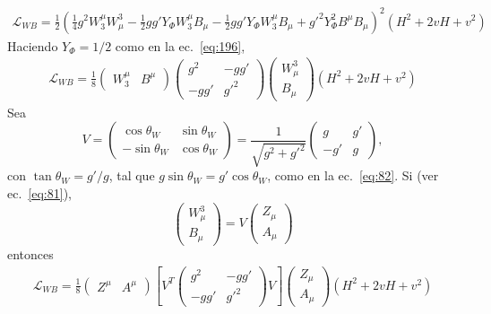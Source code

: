 \begin{align}
  \mathcal{L}_{WB}=\frac{1}{2}\left(\tfrac{1}{4}g^2W_3^\mu W^3_\mu-\tfrac{1}{2}gg'Y_\Phi W_3^\mu B_\mu-\tfrac{1}{2}gg'Y_\Phi W_3^\mu B_\mu+{g'}^2Y_\Phi ^2B^\mu B_\mu\right)^2\left(H^2+2vH+v^2\right)
\end{align}
Haciendo $Y_\Phi =1/2$ como en la ec.~\eqref{eq:196},
\begin{align}
  \mathcal{L}_{WB}=\frac{1}{8}
  \begin{pmatrix}
    W^\mu_3 & B^\mu
  \end{pmatrix}
  \begin{pmatrix}
    g^2&-gg'\\
    -gg'&{g'}^2
  \end{pmatrix}
  \begin{pmatrix}
    W^3_\mu\\
    B_\mu
  \end{pmatrix}
\left(H^2+2vH+v^2\right)
\end{align}
Sea
\begin{equation}
  V=\begin{pmatrix}
    \cos\theta_W & \sin\theta_W\\
    -\sin\theta_W& \cos\theta_W
  \end{pmatrix}=
  \frac{1}{\sqrt{g^2+{g'}^2}}\begin{pmatrix}
    g   & g'\\
    -g' & g
  \end{pmatrix},
\end{equation}
con $\tan\theta_W=g'/g$, tal que $g\sin\theta_W=g'\cos\theta_W$, como en la ec.~\eqref{eq:82}. Si (ver ec.~\eqref{eq:81}),
\begin{equation}
  \begin{pmatrix}
    W^3_\mu\\
    B_\mu
  \end{pmatrix}=V
  \begin{pmatrix}
    Z_\mu\\
    A_\mu
  \end{pmatrix}
\end{equation}
entonces
\begin{align}
  \mathcal{L}_{WB}=\frac{1}{8}
  \begin{pmatrix}
    Z^\mu & A^\mu
  \end{pmatrix}\left[V^T
  \begin{pmatrix}
    g^2&-gg'\\
    -gg'&{g'}^2
  \end{pmatrix}V\right]
  \begin{pmatrix}
    Z_\mu\\
    A_\mu
  \end{pmatrix}
\left(H^2+2vH+v^2\right)
\end{align}
